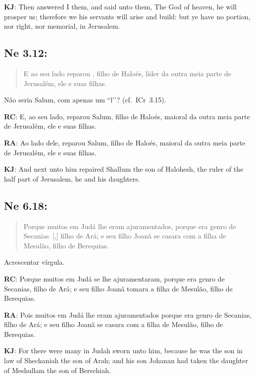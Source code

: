 \textbf{KJ}: Then answered I them, and said unto them, The God of heaven, he will prosper us; therefore we his servants will arise and build: but ye have no portion, nor right, nor memorial, in Jerusalem.

\subsection*{Ne 3.12:} 
\begin{quote}
    \small
E ao seu lado reparou , filho de Haloés, líder da outra meia parte de Jerusalém, ele e suas filhas.
\end{quote}

Não seria Salum, com apenas um ``l’’? (cf.~ICr~3.15).

\textbf{RC}: E, ao seu lado, reparou Salum, filho de Haloés, maioral da outra meia parte de Jerusalém, ele e suas filhas.

\textbf{RA}: Ao lado dele, reparou Salum, filho de Haloés, maioral da outra meia parte de Jerusalém, ele e suas filhas.

\textbf{KJ}: And next unto him repaired Shallum the son of Halohesh, the ruler of the half part of Jerusalem, he and his daughters.

\subsection*{Ne 6.18:} 
\begin{quote}
    \small
Porque muitos em Judá lhe eram ajuramentados, porque era genro de Secanias~[,] filho de Ará; e seu filho Joanã se casara com a filha de Mesulão, filho de Berequias.
\end{quote}

Acrescentar vírgula.

\textbf{RC}: Porque muitos em Judá se lhe ajuramentaram, porque era genro de Secanias, filho de Ará; e seu filho Joanã tomara a filha de Mesulão, filho de Berequias.

\textbf{RA}: Pois muitos em Judá lhe eram ajuramentados porque era genro de Secanias, filho de Ará; e seu filho Joanã se casara com a filha de Mesulão, filho de Berequias.

\textbf{KJ}: For there were many in Judah sworn unto him, because he was the son in law of Shechaniah the son of Arah; and his son Johanan had taken the daughter of Meshullam the son of Berechiah.


